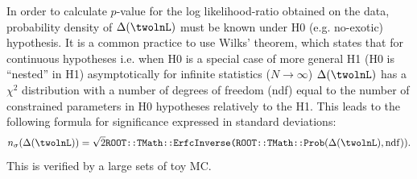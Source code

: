  
%
%

In order to calculate $p$-value for the log likelihood-ratio obtained on the data, 
probability density of $\Delta(\twolnL)$ must be known under H0 (e.g. no-exotic) hypothesis. 
It is a common practice to use Wilks’ theorem, 
which states that for continuous hypotheses i.e. 
when H0 is a special case of more general H1 (H0 is “nested” in H1) asymptotically 
for infinite statistics ($N\to\infty$) $\Delta(\twolnL)$ has a $\chi^2$ distribution 
with a number of degrees of freedom (ndf) equal to the number of constrained parameters in H0 hypotheses relatively to the H1. 
This leads to the following formula for significance expressed in standard deviations:
\begin{equation}
n_{\sigma}(\Delta(\twolnL)) =
\sqrt{2} \texttt{ROOT::TMath::ErfcInverse(ROOT::TMath::Prob}(\Delta(\twolnL), {\rm ndf})) . 
\end{equation}
This is verified by a large sets of toy MC. 

